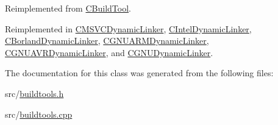 Reimplemented from \hyperlink{classCBuildTool_abea21a0e61ab2177effdff5aaa169585}{C\-Build\-Tool}.



Reimplemented in \hyperlink{classCMSVCDynamicLinker_aae22160e1bee1d4231ce669ac0132937}{C\-M\-S\-V\-C\-Dynamic\-Linker}, \hyperlink{classCIntelDynamicLinker_a9716e2053535fcadd92d46699d8b445e}{C\-Intel\-Dynamic\-Linker}, \hyperlink{classCBorlandDynamicLinker_acbf22349e7e89873dac5f55f8d9adc8b}{C\-Borland\-Dynamic\-Linker}, \hyperlink{classCGNUARMDynamicLinker_a3f49a2938f97c58d9eaee0986f3b9866}{C\-G\-N\-U\-A\-R\-M\-Dynamic\-Linker}, \hyperlink{classCGNUAVRDynamicLinker_a08c53dfc9f1352a486bfb736aee544f4}{C\-G\-N\-U\-A\-V\-R\-Dynamic\-Linker}, and \hyperlink{classCGNUDynamicLinker_ae156df1627238831556bd40597694d7e}{C\-G\-N\-U\-Dynamic\-Linker}.



The documentation for this class was generated from the following files\-:\begin{DoxyCompactItemize}
\item 
src/\hyperlink{buildtools_8h}{buildtools.\-h}\item 
src/\hyperlink{buildtools_8cpp}{buildtools.\-cpp}\end{DoxyCompactItemize}
